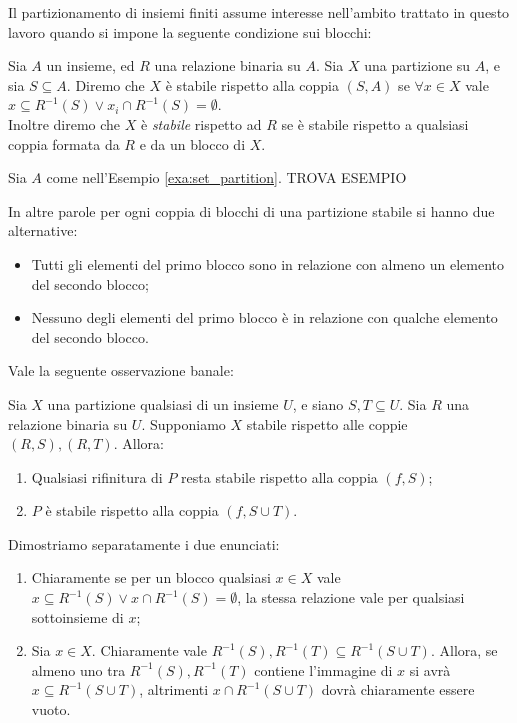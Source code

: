 Il partizionamento di insiemi finiti assume interesse nell'ambito trattato in questo lavoro quando si impone la seguente condizione sui blocchi:
\begin{definition}
    Sia $A$ un insieme, ed $R$ una relazione binaria su $A$. Sia $X$ una partizione su $A$, e sia $S \subseteq A$. Diremo che $X$ è stabile rispetto alla coppia $(S,A)$ se $\forall x \in X$ vale $x \subseteq R^{-1}(S) \lor x_i \cap R^{-1}(S) = \emptyset$.\\
    Inoltre diremo che $X$ è \emph{stabile} rispetto ad $R$ se è stabile rispetto a qualsiasi coppia formata da $R$ e da un blocco di $X$.
\end{definition}
\begin{example}
    \label{exa:set_partition_stable}
    Sia $A$ come nell'Esempio \ref{exa:set_partition}. TROVA ESEMPIO
\end{example}
In altre parole per ogni coppia di blocchi di una partizione stabile si hanno due alternative:
\begin{itemize}
    \item Tutti gli elementi del primo blocco sono in relazione con almeno un elemento del secondo blocco;
    \item Nessuno degli elementi del primo blocco è in relazione con qualche elemento del secondo blocco.
\end{itemize}
Vale la seguente osservazione banale:
\begin{observation}
    Sia $X$ una partizione qualsiasi di un insieme $U$, e siano $S,T \subseteq U$. Sia $R$ una relazione binaria su $U$. Supponiamo $X$ stabile rispetto alle coppie $(R,S),(R,T)$. Allora:
    \begin{enumerate}
        \item Qualsiasi rifinitura di $P$ resta stabile rispetto alla coppia $(f,S)$;
        \item $P$ è stabile rispetto alla coppia $(f,S \cup T)$.
    \end{enumerate}
\end{observation}
\begin{proof2}
    Dimostriamo separatamente i due enunciati:
    \begin{enumerate}
        \item Chiaramente se per un blocco qualsiasi $x \in X$ vale $x \subseteq R^{-1}(S) \lor x \cap R^{-1}(S) = \emptyset$, la stessa relazione vale per qualsiasi sottoinsieme di $x$;
        \item Sia $x \in X$. Chiaramente vale $R^{-1}(S),R^{-1}(T) \subseteq R^{-1}(S \cup T)$. Allora, se almeno uno tra $R^{-1}(S),R^{-1}(T)$ contiene l'immagine di $x$ si avrà $x \subseteq R^{-1}(S \cup T)$, altrimenti $x \cap R^{-1}(S \cup T)$ dovrà chiaramente essere vuoto.
    \end{enumerate}
\end{proof2}

